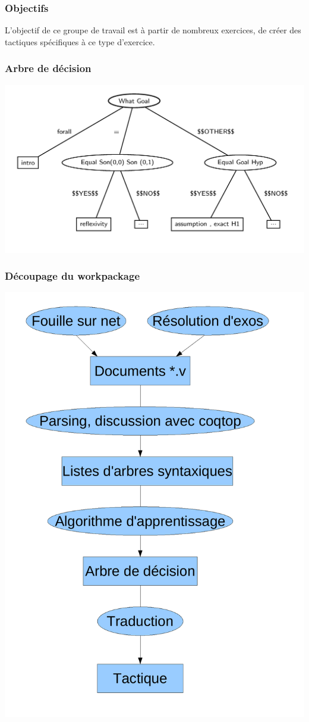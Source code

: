 \begin{frame}
\frametitle{Objectifs} 

L'objectif de ce groupe de travail est à partir de nombreux exercices, de créer des tactiques spécifiques à ce type d'exercice.

\end{frame}

\begin{frame}
\frametitle{Arbre de décision}
\includegraphics{../images/apprentissage/decision_tree.jpg}
\end{frame}

\begin{frame}
\frametitle{Découpage du workpackage}
\includegraphics[scale=0.2]{../images/apprentissage/organisation_apprentissage.pdf}
\end{frame}


